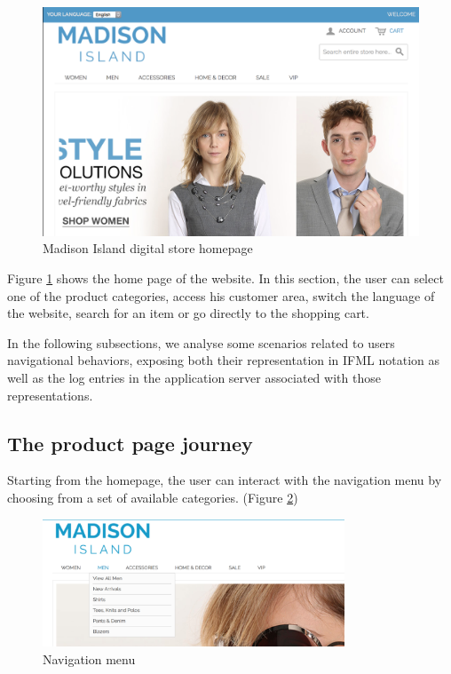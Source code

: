 \vspace{0.5cm}
\begin{figure}[htbp]
  \centering
    \includegraphics[width=12cm]{images/home.png}
  \caption{Madison Island digital store homepage}
  \label{fig:home}
\end{figure}
\vspace{0.5cm}


Figure \ref{fig:home} shows the home page of the website. In this section, the user can select one of the product categories, access his customer area, switch the language of the website, search for an item or go directly to the shopping cart. 

In the following subsections, we analyse some scenarios related to users navigational behaviors, exposing both their representation in IFML notation as well as the log entries in the application server associated with those representations.

\newpage
\subsection{The product page journey}

Starting from the homepage, the user can interact with the navigation menu by choosing from a set of available categories.  (Figure \ref{fig:navigation})

\vspace{0.5cm}
\begin{figure}[H]
  \centering
    \includegraphics[width=9cm]{images/madison/navigation.png}
  \caption{Navigation menu}
  \label{fig:navigation}
\end{figure}
\vspace{0.5cm}


